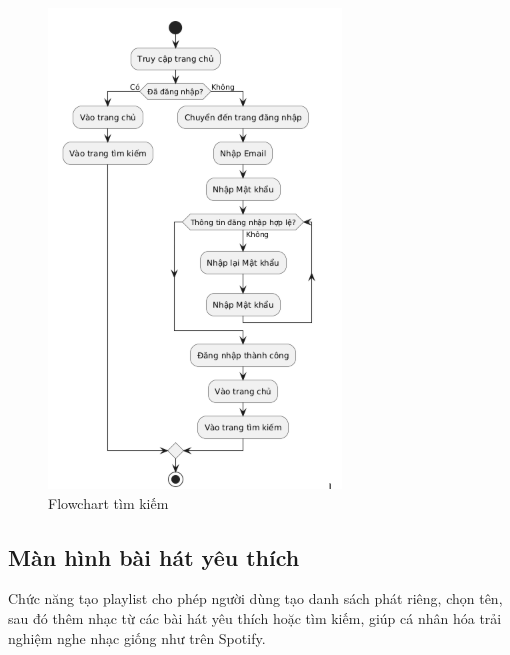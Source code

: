 \begin{figure}
    \centering
    \includegraphics[width=1\linewidth]{images/flowchart-tim-kiem.png}
    \caption{Flowchart tìm kiếm}
    \label{fig:flowchart-tim-kiem}
\end{figure}

\subsection{Màn hình bài hát yêu thích}
\label{subsec:yeu-thich}

Chức năng tạo playlist cho phép người dùng tạo danh sách phát riêng, chọn tên, sau đó thêm nhạc từ các bài hát yêu thích hoặc tìm kiếm, giúp cá nhân hóa trải nghiệm nghe nhạc giống như trên Spotify.

